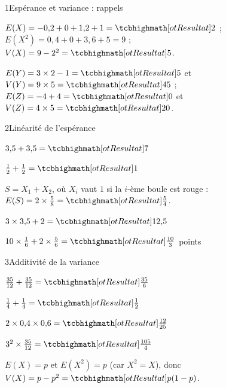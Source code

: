 

\begin{deuxcolonnes}

\begin{corrige}{1}{Espérance et variance : rappels}
\begin{questions}
  \item $E(X)=-0{,}2+0+1{,}2+1=\res{2}$ ;\\ $E\left(X^{2}\right)=0{,}4+0+3{,}6+5=9$ ;\\ $V(X)=9-2^{2}=\res{5}$.
  \item $E(Y)=3\times2-1=\res{5}$ et $V(Y)=9\times5=\res{45}$ ;\\ $E(Z)=-4+4=\res{0}$ et $V(Z)=4\times5=\res{20}$.
\end{questions}
\end{corrige}

\begin{corrige}{2}{Linéarité de l'espérance}
\begin{questions}
  \item $3{,}5+3{,}5=\res{7}$
  \item $\frac12+\frac12=\res{1}$
  \item $S=X_1+X_2$, où $X_i$ vaut $1$ si la $i$-ème boule est rouge : $E(S)=2\times\frac58=\res{\frac54}$.
  \item $3\times3{,}5+2=\res{12{,}5}$
  \item $10\times\frac16+2\times\frac56=\res{\frac{10}{3}}$ points
\end{questions}
\end{corrige}

\begin{corrige}{3}{Additivité de la variance}
\begin{questions}
  \item $\frac{35}{12}+\frac{35}{12}=\res{\frac{35}{6}}$
  \item $\frac14+\frac14=\res{\frac12}$
  \item $2\times0{,}4\times0{,}6=\res{\frac{12}{25}}$
  \item $3^{2}\times\frac{35}{12}=\res{\frac{105}{4}}$
  \item $E(X)=p$ et $E\left(X^{2}\right)=p$ (car $X^{2}=X$), donc $V(X)=p-p^{2}=\res{p(1-p)}$.
\end{questions}
\end{corrige}


\end{deuxcolonnes}
